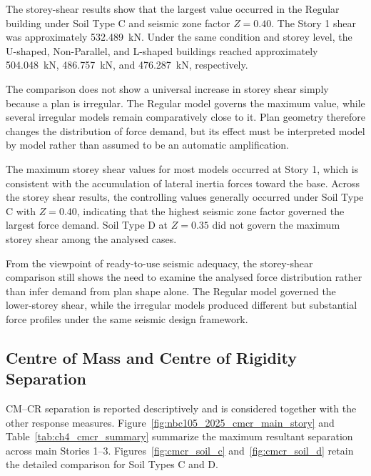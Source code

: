 The storey-shear results show that the largest value occurred in the Regular building under Soil Type C and seismic zone factor $Z=0.40$. The Story 1 shear was approximately 532.489~kN. Under the same condition and storey level, the U-shaped, Non-Parallel, and L-shaped buildings reached approximately 504.048~kN, 486.757~kN, and 476.287~kN, respectively.

The comparison does not show a universal increase in storey shear simply because a plan is irregular. The Regular model governs the maximum value, while several irregular models remain comparatively close to it. Plan geometry therefore changes the distribution of force demand, but its effect must be interpreted model by model rather than assumed to be an automatic amplification.

The maximum storey shear values for most models occurred at Story 1, which is consistent with the accumulation of lateral inertia forces toward the base. Across the storey shear results, the controlling values generally occurred under Soil Type C with $Z=0.40$, indicating that the highest seismic zone factor governed the largest force demand. Soil Type D at $Z=0.35$ did not govern the maximum storey shear among the analysed cases.

From the viewpoint of ready-to-use seismic adequacy, the storey-shear comparison still shows the need to examine the analysed force distribution rather than infer demand from plan shape alone. The Regular model governed the lower-storey shear, while the irregular models produced different but substantial force profiles under the same seismic design framework.



\subsection{Centre of Mass and Centre of Rigidity Separation}
CM--CR separation is reported descriptively and is considered together with the other response measures. Figure~\ref{fig:nbc105_2025_cmcr_main_story} and Table~\ref{tab:ch4_cmcr_summary} summarize the maximum resultant separation across main Stories 1--3. Figures~\ref{fig:cmcr_soil_c} and~\ref{fig:cmcr_soil_d} retain the detailed comparison for Soil Types C and D.

